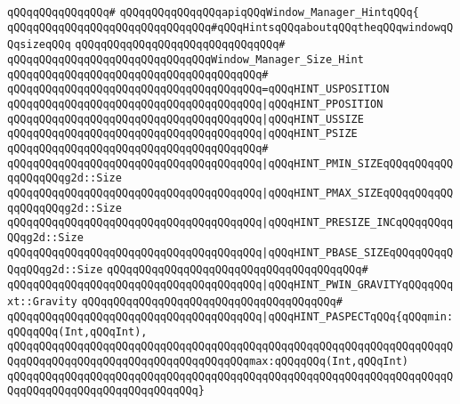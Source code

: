 \verb|qQQqqQQqqQQqqQQq#|\newline
\verb|qQQqqQQqqQQqqQQqapiqQQqWindow_Manager_HintqQQq{|\newline
\newline
\verb|qQQqqQQqqQQqqQQqqQQqqQQqqQQqqQQq#qQQqHintsqQQqaboutqQQqtheqQQqwindowqQQqsizeqQQq|\newline
\verb|qQQqqQQqqQQqqQQqqQQqqQQqqQQqqQQq#|\newline
\verb|qQQqqQQqqQQqqQQqqQQqqQQqqQQqqQQqWindow_Manager_Size_Hint|\newline
\verb|qQQqqQQqqQQqqQQqqQQqqQQqqQQqqQQqqQQqqQQq#|\newline
\verb|qQQqqQQqqQQqqQQqqQQqqQQqqQQqqQQqqQQqqQQq=qQQqHINT_USPOSITION|\newline
\verb|qQQqqQQqqQQqqQQqqQQqqQQqqQQqqQQqqQQqqQQq|\verb#|qQQqHINT_PPOSITION#\newline
\verb|qQQqqQQqqQQqqQQqqQQqqQQqqQQqqQQqqQQqqQQq|\verb#|qQQqHINT_USSIZE#\newline
\verb|qQQqqQQqqQQqqQQqqQQqqQQqqQQqqQQqqQQqqQQq|\verb#|qQQqHINT_PSIZE#\newline
\verb|qQQqqQQqqQQqqQQqqQQqqQQqqQQqqQQqqQQqqQQq#|\newline
\verb|qQQqqQQqqQQqqQQqqQQqqQQqqQQqqQQqqQQqqQQq|\verb#|qQQqHINT_PMIN_SIZEqQQqqQQqqQQqqQQqqQQqg2d::Size#\newline
\verb|qQQqqQQqqQQqqQQqqQQqqQQqqQQqqQQqqQQqqQQq|\verb#|qQQqHINT_PMAX_SIZEqQQqqQQqqQQqqQQqqQQqg2d::Size#\newline
\verb|qQQqqQQqqQQqqQQqqQQqqQQqqQQqqQQqqQQqqQQq|\verb#|qQQqHINT_PRESIZE_INCqQQqqQQqqQQqg2d::Size#\newline
\verb|qQQqqQQqqQQqqQQqqQQqqQQqqQQqqQQqqQQqqQQq|\verb#|qQQqHINT_PBASE_SIZEqQQqqQQqqQQqqQQqg2d::Size#\newline
\verb|qQQqqQQqqQQqqQQqqQQqqQQqqQQqqQQqqQQqqQQq#|\newline
\verb|qQQqqQQqqQQqqQQqqQQqqQQqqQQqqQQqqQQqqQQq|\verb#|qQQqHINT_PWIN_GRAVITYqQQqqQQqxt::Gravity#\newline
\verb|qQQqqQQqqQQqqQQqqQQqqQQqqQQqqQQqqQQqqQQq#|\newline
\verb|qQQqqQQqqQQqqQQqqQQqqQQqqQQqqQQqqQQqqQQq|\verb#|qQQqHINT_PASPECTqQQq{qQQqmin:qQQqqQQq(Int,qQQqInt),#\newline
\verb|qQQqqQQqqQQqqQQqqQQqqQQqqQQqqQQqqQQqqQQqqQQqqQQqqQQqqQQqqQQqqQQqqQQqqQQqqQQqqQQqqQQqqQQqqQQqqQQqqQQqqQQqqQQqmax:qQQqqQQq(Int,qQQqInt)|\newline
\verb|qQQqqQQqqQQqqQQqqQQqqQQqqQQqqQQqqQQqqQQqqQQqqQQqqQQqqQQqqQQqqQQqqQQqqQQqqQQqqQQqqQQqqQQqqQQqqQQqqQQq}|\newline
